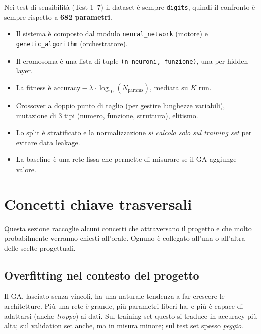 \documentclass[11pt,a4paper]{article}
\begin{document}
Nei test di sensibilità (Test 1--7) il dataset è sempre \texttt{digits},
quindi il confronto è sempre rispetto a \textbf{682 parametri}.

\begin{riassunto}
\begin{itemize}
    \item Il sistema è composto dal modulo \texttt{neural\_network} (motore) e \texttt{genetic\_algorithm} (orchestratore).
    \item Il cromosoma è una lista di tuple \texttt{(n\_neuroni, funzione)}, una per hidden layer.
    \item La fitness è $\text{accuracy} - \lambda \cdot \log_{10}(N_{\text{params}})$, mediata su $K$ run.
    \item Crossover a doppio punto di taglio (per gestire lunghezze variabili), mutazione di 3 tipi (numero, funzione, struttura), elitismo.
    \item Lo split è stratificato e la normalizzazione \emph{si calcola solo sul training set} per evitare data leakage.
    \item La baseline è una rete fissa che permette di misurare se il GA aggiunge valore.
\end{itemize}
\end{riassunto}

\newpage

\section{Concetti chiave trasversali}

Questa sezione raccoglie alcuni concetti che attraversano il progetto e
che molto probabilmente verranno chiesti all'orale. Ognuno è collegato
all'una o all'altra delle scelte progettuali.

\subsection{Overfitting nel contesto del progetto}

\label{ssec:overfitting}

Il GA, lasciato senza vincoli, ha una naturale tendenza a far crescere
le architetture. Più una rete è grande, più parametri liberi ha, e più
è capace di adattarsi (anche \emph{troppo}) ai dati. Sul training set
questo si traduce in accuracy più alta; sul validation set anche, ma in
misura minore; sul test set spesso \emph{peggio}.
\end{document}
